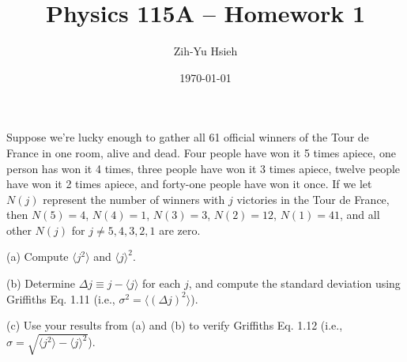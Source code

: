 \documentclass{article}
\title{Physics 115A -- Homework 1}
\author{Zih-Yu Hsieh}
\date{\today}
\begin{document}
\maketitle

\begin{ques}\label{q1}
Suppose we’re lucky enough to gather all 61 official winners of the Tour de France in one
room, alive and dead. Four people have won it 5 times apiece, one person has won it 4
times, three people have won it 3 times apiece, twelve people have won it 2 times apiece, and
forty-one people have won it once. If we let $N(j)$ represent the number of winners with $j$
victories in the Tour de France, then $N(5) = 4$, $N(4) = 1$, $N(3) = 3$, $N(2) = 12$, $N(1) = 41$,
and all other $N(j)$ for $j \neq 5, 4, 3, 2, 1$ are zero.

(a) Compute $\langle j^2\rangle$ and $\langle j\rangle^2$.

(b) Determine $\Delta j \equiv j-\langle j\rangle$ for each $j$, and compute the standard deviation using Griffiths
Eq. 1.11 (i.e., $\sigma^2 = \langle (\Delta j)^2\rangle$).

(c) Use your results from (a) and (b) to verify Griffiths Eq. 1.12 (i.e., $\sigma =
\sqrt{\langle j^2\rangle - \langle j\rangle^2}$). %
\end{ques}
\end{document}
